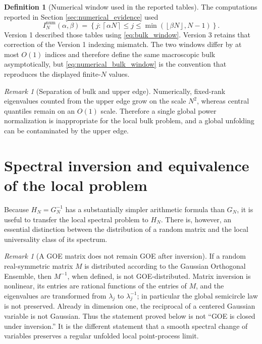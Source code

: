 \documentclass[11pt]{amsart}
\numberwithin{equation}{section}
\theoremstyle{plain}
\theoremstyle{definition}
\newtheorem{definition}[theorem]{Definition}
\theoremstyle{remark}
\newtheorem{remark}[theorem]{Remark}
\begin{document}
\begin{definition}[Numerical window used in the reported tables]
\label{def:numerical_bulk_window}
The computations reported in Section \ref{sec:numerical_evidence} used
\begin{equation}
I_N^{\mathrm{num}}(\alpha,\beta)
=
\left\{j:\left\lceil\alpha N\right\rceil
\le j\le
\min\!\left(\left\lfloor\beta N\right\rfloor,N-1\right)\right\}.
\label{eq:numerical_bulk_window}
\end{equation}
Version 1 described those tables using \eqref{eq:bulk_window}.  Version 3 retains that correction of the Version 1 indexing mismatch.  The two windows differ by at most $O(1)$ indices and therefore define the same macroscopic bulk asymptotically, but \eqref{eq:numerical_bulk_window} is the convention that reproduces the displayed finite-$N$ values.
\end{definition}

\begin{remark}[Separation of bulk and upper edge]
\label{rem:edge_bulk_separation}
Numerically, fixed-rank eigenvalues counted from the upper edge grow on the scale $N^2$, whereas central quantiles remain on an $O(1)$ scale.  Therefore a single global power normalization is inappropriate for the local bulk problem, and a global unfolding can be contaminated by the upper edge.
\end{remark}

\section{Spectral inversion and equivalence of the local problem}
\label{sec:spectral_inversion}

Because $H_N=G_N^{-1}$ has a substantially simpler arithmetic formula than $G_N$, it is useful to transfer the local spectral problem to $H_N$.  There is, however, an essential distinction between the distribution of a random matrix and the local universality class of its spectrum.

\begin{remark}[A GOE matrix does not remain GOE after inversion]
\label{rem:inverse_not_goe_ensemble}
If a random real-symmetric matrix $M$ is distributed according to the Gaussian Orthogonal Ensemble, then $M^{-1}$, when defined, is not GOE-distributed.  Matrix inversion is nonlinear, its entries are rational functions of the entries of $M$, and the eigenvalues are transformed from $\lambda_j$ to $\lambda_j^{-1}$; in particular the global semicircle law is not preserved.  Already in dimension one, the reciprocal of a centered Gaussian variable is not Gaussian.  Thus the statement proved below is not ``GOE is closed under inversion.''  It is the different statement that a smooth spectral change of variables preserves a regular unfolded local point-process limit.
\end{remark}
\end{document}
